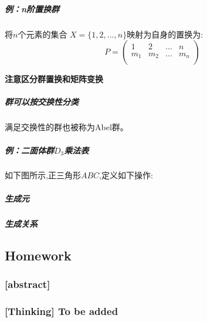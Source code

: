         \subparagraph*{例：n阶置换群}将$n$个元素的集合 $X=\{1,2,...,n\}$映射为自身的置换为:
        \begin{equation*}
            P=
            \left(
                \begin{array}{cccc}
                    1   & 2     & ... & n   \\
                    m_1 & m_2   & ... & m_n \\
                \end{array}
            \right)
        \end{equation*}
        \begin{center}
            \bfseries{注意区分群置换和矩阵变换}
        \end{center}
        \subparagraph*{群可以按交换性分类}满足交换性的群也被称为Abel群。
        \subparagraph*{例：二面体群$D_3$乘法表}如下图所示,正三角形$ABC$,定义如下操作:
        \noindent{}
        \subparagraph*{生成元}
        \subparagraph*{生成关系}
        
    \subsection*{Homework}
        \subsubsection*{[abstract]}
        \subsubsection{[Thinking] To be added}